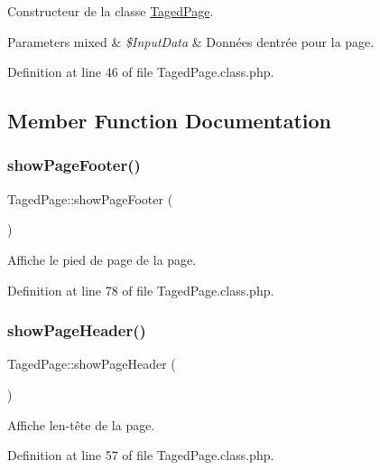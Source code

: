 Constructeur de la classe \hyperlink{class_taged_page}{Taged\+Page}. 
\begin{DoxyParams}[1]{Parameters}
mixed & {\em \$\+Input\+Data} & Données d\textquotesingle{}entrée pour la page. \\
\hline
\end{DoxyParams}


Definition at line 46 of file Taged\+Page.\+class.\+php.



\subsection{Member Function Documentation}
\mbox{\label{class_taged_page_a1234aefa5c7b8301eb508d00692e6ce2}} 
\subsubsection{\texorpdfstring{show\+Page\+Footer()}{showPageFooter()}}
{\footnotesize\ttfamily Taged\+Page\+::show\+Page\+Footer (\begin{DoxyParamCaption}{ }\end{DoxyParamCaption})}

Affiche le pied de page de la page. 

Definition at line 78 of file Taged\+Page.\+class.\+php.

\mbox{\label{class_taged_page_ad5e40098b03ac3f0aab840cad680c91e}} 
\subsubsection{\texorpdfstring{show\+Page\+Header()}{showPageHeader()}}
{\footnotesize\ttfamily Taged\+Page\+::show\+Page\+Header (\begin{DoxyParamCaption}{ }\end{DoxyParamCaption})}

Affiche l\textquotesingle{}en-\/tête de la page. 

Definition at line 57 of file Taged\+Page.\+class.\+php.



